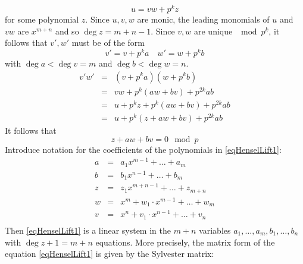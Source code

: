 \documentclass{article}
\begin{document}
\[ 
u = vw + p^k z 
\]
for some polynomial \(z\). Since \(u,v,w\) are monic, the leading monomials of \(u\) and \(vw\) are $x^{m+n}$ and so $\deg z = m + n - 1$. Since  \(v, w\) are unique \(\mod p^{k}\), it follows that \(v', w'\) must be of the form 
\[
v' = v + p^{k} a \quad w' = w+ p^k b
\]
with \(\deg a < \deg v= m\) and \(\deg b < \deg w = n\). 
\[
\begin{array}{rcl}
v' w'& =& \left(v+p^k a\right)\left(w + p^k b\right) \\
&=&vw + p^k(aw + bv) + p^{2k} ab\\
&=&u + p^{k}z + p^{k}(aw+bv) + p^{2k}ab\\
&=&u + p^{k}\left( z + aw + bv\right) + p^{2k}ab
\end{array}
\]
It follows that 
\begin{equation}\label{eqHenselLift1}
z + aw + bv = 0 \mod p
\end{equation} 
Introduce notation for the coefficients of the polynomials in \eqref{eqHenselLift1}:
\begin{equation}
\begin{array}{rcl}
a &=& a_{1} x^{m-1} + \dots + a_m\\
b &=& b_{1} x^{n-1} + \dots + b_m \\
z &=& z_{1}x^{m + n - 1} + \dots +z_{m+n}\\
w &=& x^{m} + w_{1} \cdot x^{m - 1} + \dots + w_{m}\\
v &=& x^{n} + v_{1} \cdot x^{n - 1} + \dots + v_{n}\\
\end{array}
\end{equation}
Then \eqref{eqHenselLift1} is a linear system in the \(m+n\) variables \(a_1, \dots, a_m, b_1, \dots, b_n\) with $\deg z + 1 = m + n $ equations. More precisely, the matrix form of the equation \eqref{eqHenselLift1} is given by the Sylvester matrix:
\end{document}
